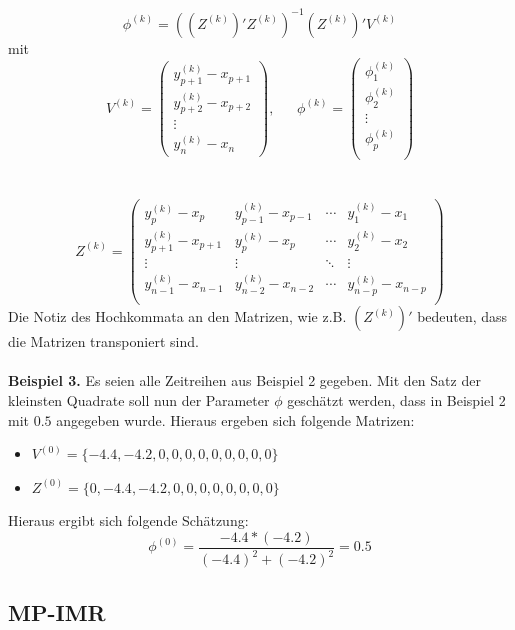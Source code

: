 \[
    \phi^{(k)} = \left(\left(Z^{(k)}\right)' Z^{(k)} \right)^{-1} \left(Z^{(k)}\right)'V^{(k)}
\]
mit
\[
    V^{(k)} = \left(\begin{matrix}
        y^{(k)}_{p+1} - x_{p+1}\\
        y^{(k)}_{p+2} - x_{p+2}\\
        \vdots\\
        y^{(k)}_{n} - x_{n}
    \end{matrix}\right),~~~~~~~
    \phi^{(k)} = \left(\begin{matrix}
        \phi_1^{(k)}\\
        \phi_2^{(k)}\\
        \vdots\\
        \phi_p^{(k)}\\
    \end{matrix}\right)
\]
~\\
~\\
\[
    Z^{(k)} = \left(\begin{matrix}
        y_{p}^{(k)} - x_{p} & y_{p-1}^{(k)} - x_{p-1} & \cdots & y_{1}^{(k)} - x_{1}\\
        y_{p+1}^{(k)} - x_{p+1} & y_{p}^{(k)} - x_{p} & \cdots & y_{2}^{(k)} - x_{2}\\
        \vdots & \vdots & \ddots & \vdots \\
        y_{n-1}^{(k)} - x_{n-1} & y_{n-2}^{(k)} - x_{n-2} & \cdots & y_{n-p}^{(k)} - x_{n-p}\\
    \end{matrix}\right)
\]
Die Notiz des Hochkommata an den Matrizen, wie z.B. $\left(Z^{(k)}\right)'$ bedeuten, dass die Matrizen transponiert sind.
\\
\\
\textbf{Beispiel 3.} Es seien alle Zeitreihen aus Beispiel 2 gegeben. Mit den
Satz der kleinsten Quadrate soll nun der Parameter $\phi$ geschätzt werden,
dass in Beispiel 2 mit $0.5$ angegeben wurde. Hieraus ergeben sich folgende Matrizen:
\begin{itemize}
    \item $ V^{(0)}= \{-4.4, -4.2, 0, 0, 0, 0, 0, 0, 0, 0, 0\}$
    \item $Z^{(0)} = \{0, -4.4, -4.2, 0, 0, 0, 0, 0, 0, 0, 0\}$
\end{itemize}
Hieraus ergibt sich folgende Schätzung:
\[
    \phi^{(0)} = \frac{-4.4 * (-4.2)}{(-4.4)^2 + (-4.2)^2} = 0.5
\]


\subsection{MP-IMR}

